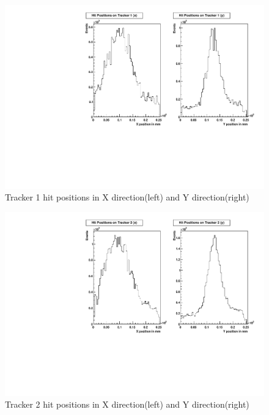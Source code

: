 \begin{figure}[!htbp]
\centering
\includegraphics[width=5.1in]{figures/GEM/Tracker1_Hit_position_Run1897.pdf}
\caption{Tracker 1 hit positions in X direction(left) and Y direction(right)}\label{fig:t1hit}
\end{figure}

\begin{figure}[!htbp]
\centering
\includegraphics[width=5.1in]{figures/GEM/Tracker2_Hit_position_Run1897.pdf}
\caption{Tracker 2 hit positions in X direction(left) and Y direction(right)}\label{fig:t2hit}
\end{figure}

